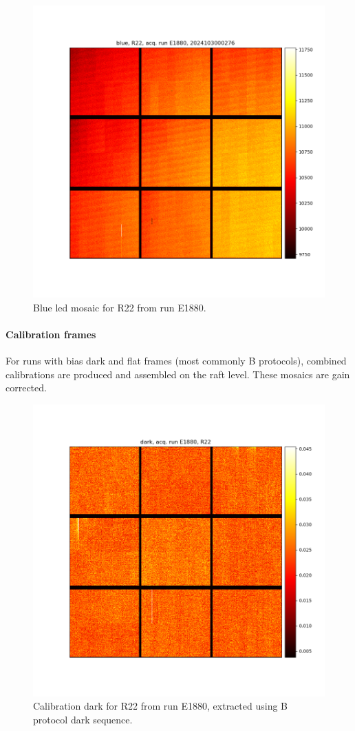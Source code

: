 \begin{figure}[ht]
    \centering
    \includegraphics[width=0.8\linewidth]{figures/ReferenceFigures/eoRaftMosaic_LSSTCam_blue_MC_C_20241030_000276_R22_S00_u_lsstccs_eo_raft_lambda_mosaics_E1880_w_2024_35_20241101T020341Z.png}
    \caption{Blue led mosaic for R22 from run E1880.}
    \label{fig:ref:blueLambda}
\end{figure}
\clearpage
\paragraph{Calibration frames}

For runs with bias dark and flat frames (most commonly B protocols), combined calibrations are produced and assembled on the raft level. These mosaics are gain corrected.

\begin{figure}[ht]
    \centering
    \includegraphics[width=0.8\linewidth]{figures/ReferenceFigures/eoDarkRaftMosaic_LSSTCam_R22_S00_u_lsstccs_eo_raft_calib_mosaics_E1880_w_2024_35_20241101T020324Z.png}
    \caption{Calibration dark for R22 from run E1880, extracted using B protocol dark sequence.}
    \label{fig:ref:calibFrame}
\end{figure}
\clearpage
